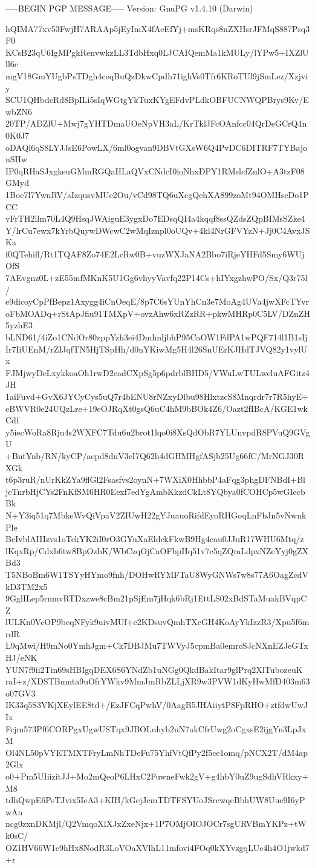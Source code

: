 -----BEGIN PGP MESSAGE-----
Version: GnuPG v1.4.10 (Darwin)

hQIMA77xv53FwjH7ARAAp5jEyImX4fAeEfYj+msKRqs8nZXHsrJFMqS887Psq3F0
KCsB23qU6IgMPgkRenvwkzLL3TdbHxq0LJCAIQemMa1kMULy/lYPw5+IXZlUll6c
mgV18GmYUgbPsTDgh4ceqBuQzDkwCpdh71ighVs0Tfr6KRoTUl9jSmLez/Xzjviy
SCU1QHbdcRd8BpILi5sIqWGtgYkTuxKYgEFdvPLdkOBFUCNWQPBrys9Kv/EwbZN6
20TP/ADZlU+Mwj7gYHTDmaUOeNpVH3aL/KrTklJFcOAnfcc04QrDeGCrQ4n0K0J7
oDAQl6qS8LYJJsE6PowLX/6ml0ogvan9DBVtGXsW6Q4PvDC6DITRF7TYBajonSHw
IP0qRHaSJxgkeuGMmRGQaHLaQVxCNdcI0ioNhxDPY1RMslcfZnlO+A3tzF08GMyd
1Boc7l7YwnRV/aIzqusvMUc2Ou/vCd98TQ6uXcgQehXA899zoMt94OMHscDo1PCC
vFrTH2llm70L4Q9HsqJWAiguE3ygxDo7EDsqQI4a4kqqf8ssQZdsZQpBIMsSZke4
Y/lrCu7ewx7kYrbQuywDWcwC2wMqIznpl0oUQv+4kl4NrGFVYzN+Jj0C4AvxJSKa
f0QTehifl/Rt1TQAF8Zo74E2LcRw0B+vuzWXJaNA2Bbo7iRjeYHFd5Smy6WUjOfS
7AEvgnz0L+zE55mfMKnK5U1Gg6vhyyVavfq22P14Cs+hIYxgzhwPO/Sx/Q3r75l/
e9dicoyCpPfBepz1Axygg4iCnOeqE/8p7C6sYUnYhCn3e7MoAg4UVa4jwXFcTYvr
oFbMOADq+rStApJfiu91TMXpV+ovzAhw6xRZzRR+pkwMHRp0C5LV/DZnZH5yzhE3
bLND61/4iZo1CNdOr80zppYzh3ei4DmhnljbhP95CaOW1FdPA1wPQF714l1B1sIj
Ir7IiUEnM/rZIJqfTN5HjTSpHh/d0nYKiwMg5H4l26SnUErKJHdTJVQ82y1vylUx
FJMjwyDeLxykkoaOh1rwD2eadCXpSg5p6pdrblBHD5/VWuLwTULweluAFGitz4JH
1aiFuvd+GvX6JYCyCys5uQ7r4bENU8rNZxyDlbu98HlxtzcS8Mnqrdr7r7R5hyE+
eBWVR0e24UQzLre+19eOJRqXt0gsQ6uC4hM9bBOk4Z6/Oazt2fIBcA/KGE1wkCdf
y5iecWoRa8Rju4s2WXFC7Tdu6u2brot1lqo0i8XsQdObR7YLUnvpdR8PVuQ9GVgU
+BntYnb/RN/kyCP/aepd8duV3cI7Q62h4dGHMHgfASjb25Ug66fC/MrNGJ30RXGk
t6p3ruR/nUrKkZYa9flGl2Fsasfvs2oynN+7WXiX0HhbbP4aFqg3phgDFNBdI+Bl
jeTnrbHjCYs2FnKfSM6HR0Eexf7edYgAmbKkzdCkLt8YQbya0fCOHCp5wGIecbBk
N+Y3iq51q7MbkeWvQiVpaV2ZIUwH22gYJuauoRifdEyoRHGoqLnFbJn5vNwnkPle
BcIvblAIIIzvs1oTckYK2iI0rO3GYuXaEldckFkwB9Hg4cau0JJuR17WHU6Mtq/z
lKqxRp/Cdxb6tw8BpOzbK/WbCzqOjCaOFbpHq51v7c5qZQmLdpxNZeYyj0gZXBd3
T5NBoBm6W1TSYyHYmo9fnh/DOHwRYMFTaU8WyGNWs7w8s77A6OagZcdVkD3TM2x5
9GglILep5rnmvRTDxzwe8cBm21pSjEm7jHqk6bRj1EttLS02xBdSTaMuakBVqpCZ
lULKn0VcOP9beqNFyk9uivMUf+c2KDsuvQmhTXeGH4KoAyYkIzzR3/Xpu5f6mrdR
L9qMwi/H9mNo0YmhJgm+Ck7DBJMu7TWVyJ5cpmBa0emrcSJcNXnEZJeGTxHJ/eNK
YUN7f9ii2Tin69sHBIgqDEX6S6YNdZb1uNGg0QkdBakItar9glPrq2XlTubozeuK
raI+z/XDSTBmnta9uOfrYWkv9MmJmRbZLLjXR9w3PVW1dKyHwMfD403m63o07GV3
IK33q5S3VKjXEylEE8td+/EzJFCqPwhV/0AagB5JHAiiytP8FpRHO+ztfdwUwJIx
Fcjm573Pf6CORPgxUgwUSTqx9JBOLuhyb2uN7akCfrUwg2oCgxsE2ijgYn3LpJxM
Ol4NL50pVYETMXTFryLmNhTDeFu75YhfVtQfPy2f5ce1omq/pNCX2T/dM4ap2Glx
o0+Pm5UIiizitJJ+Mo2mQeoP6LHxC2FuwneFwk2gV+g4hbY0uZ9ugSdhVRkxy+M8
tdhQwpE6PsTJvix5IeA3+KIH/kGejJcmTDTFSYUoJSrcwqcBbhUW8Uue9I6yPwAn
ncg0zxnDKMjl/Q2VmqoXlXJxZxeNjx+1P7OMjOIOJOCr7sgURVBmYKPz+tWk0sC/
OZ1HV66W1c9hHx8NodR3LoVOaXVlhL11mfovi4FOq0kXYvzgqLUe4h4O1jwkd7+r
